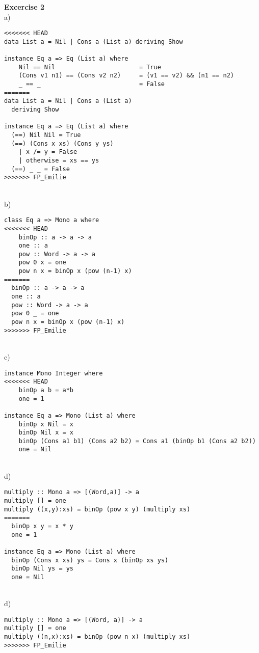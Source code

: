 \documentclass[a4paper,12pt,oneside]{book}
\begin{document}
\textbf{Excercise 2} \\%
a)
\begin{lstlisting}
<<<<<<< HEAD
data List a = Nil | Cons a (List a) deriving Show

instance Eq a => Eq (List a) where
    Nil == Nil                       = True
    (Cons v1 n1) == (Cons v2 n2)     = (v1 == v2) && (n1 == n2)
    _ == _                           = False
=======
data List a = Nil | Cons a (List a)
  deriving Show

instance Eq a => Eq (List a) where
  (==) Nil Nil = True
  (==) (Cons x xs) (Cons y ys)
    | x /= y = False
    | otherwise = xs == ys
  (==) _ _ = False
>>>>>>> FP_Emilie
\end{lstlisting}
~\\     
b)
\begin{lstlisting}
class Eq a => Mono a where
<<<<<<< HEAD
    binOp :: a -> a -> a 
    one :: a
    pow :: Word -> a -> a
    pow 0 x = one
    pow n x = binOp x (pow (n-1) x)
=======
  binOp :: a -> a -> a
  one :: a
  pow :: Word -> a -> a
  pow 0 _ = one
  pow n x = binOp x (pow (n-1) x)
>>>>>>> FP_Emilie
\end{lstlisting}
~\\     
c)
\begin{lstlisting}
instance Mono Integer where
<<<<<<< HEAD
    binOp a b = a*b
    one = 1
    
instance Eq a => Mono (List a) where
    binOp x Nil = x
    binOp Nil x = x
    binOp (Cons a1 b1) (Cons a2 b2) = Cons a1 (binOp b1 (Cons a2 b2))
    one = Nil
\end{lstlisting}
~\\     
d)
\begin{lstlisting}
multiply :: Mono a => [(Word,a)] -> a
multiply [] = one
multiply ((x,y):xs) = binOp (pow x y) (multiply xs)
=======
  binOp x y = x * y
  one = 1

instance Eq a => Mono (List a) where
  binOp (Cons x xs) ys = Cons x (binOp xs ys)
  binOp Nil ys = ys
  one = Nil
  \end{lstlisting}
~\\     
d)
\begin{lstlisting}
multiply :: Mono a => [(Word, a)] -> a
multiply [] = one
multiply ((n,x):xs) = binOp (pow n x) (multiply xs)
>>>>>>> FP_Emilie
\end{lstlisting}
~\\     
\end{document}
